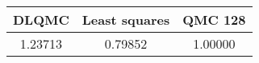 \begin{tabular}{|c|c|c|}
\hline
DLQMC&Least squares&QMC 128\\ 
\hline

1.23713 & 0.79852 & 1.00000\\ 
\hline
\end{tabular}

